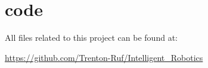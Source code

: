 \documentclass[11pt]{scrartcl} %
\begin{document}
\clearpage
\section{code}

All files related to this project can be found at: 

\url{https://github.com/Trenton-Ruf/Intelligent_Robotics}


\end{document}
